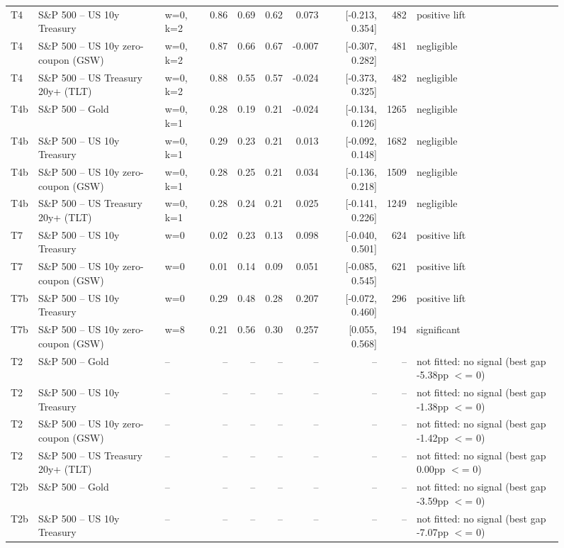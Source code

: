 \begin{figure}
\begin{tabular}{lllrrrrrrl}
T4 & S\&P 500 -- US 10y Treasury & w=0, k=2 & 0.86 & 0.69 & 0.62 & 0.073 & [-0.213, 0.354] & 482 & positive lift \\
T4 & S\&P 500 -- US 10y zero-coupon (GSW) & w=0, k=2 & 0.87 & 0.66 & 0.67 & -0.007 & [-0.307, 0.282] & 481 & negligible \\
T4 & S\&P 500 -- US Treasury 20y+ (TLT) & w=0, k=2 & 0.88 & 0.55 & 0.57 & -0.024 & [-0.373, 0.325] & 482 & negligible \\
T4b & S\&P 500 -- Gold & w=0, k=1 & 0.28 & 0.19 & 0.21 & -0.024 & [-0.134, 0.126] & 1265 & negligible \\
T4b & S\&P 500 -- US 10y Treasury & w=0, k=1 & 0.29 & 0.23 & 0.21 & 0.013 & [-0.092, 0.148] & 1682 & negligible \\
T4b & S\&P 500 -- US 10y zero-coupon (GSW) & w=0, k=1 & 0.28 & 0.25 & 0.21 & 0.034 & [-0.136, 0.218] & 1509 & negligible \\
T4b & S\&P 500 -- US Treasury 20y+ (TLT) & w=0, k=1 & 0.28 & 0.24 & 0.21 & 0.025 & [-0.141, 0.226] & 1249 & negligible \\
T7 & S\&P 500 -- US 10y Treasury & w=0 & 0.02 & 0.23 & 0.13 & 0.098 & [-0.040, 0.501] & 624 & positive lift \\
T7 & S\&P 500 -- US 10y zero-coupon (GSW) & w=0 & 0.01 & 0.14 & 0.09 & 0.051 & [-0.085, 0.545] & 621 & positive lift \\
T7b & S\&P 500 -- US 10y Treasury & w=0 & 0.29 & 0.48 & 0.28 & 0.207 & [-0.072, 0.460] & 296 & positive lift \\
T7b & S\&P 500 -- US 10y zero-coupon (GSW) & w=8 & 0.21 & 0.56 & 0.30 & 0.257 & [0.055, 0.568] & 194 & significant \\
T2 & S\&P 500 -- Gold & -- & -- & -- & -- & -- & -- & -- & not fitted: no signal (best gap -5.38pp $<$= 0) \\
T2 & S\&P 500 -- US 10y Treasury & -- & -- & -- & -- & -- & -- & -- & not fitted: no signal (best gap -1.38pp $<$= 0) \\
T2 & S\&P 500 -- US 10y zero-coupon (GSW) & -- & -- & -- & -- & -- & -- & -- & not fitted: no signal (best gap -1.42pp $<$= 0) \\
T2 & S\&P 500 -- US Treasury 20y+ (TLT) & -- & -- & -- & -- & -- & -- & -- & not fitted: no signal (best gap 0.00pp $<$= 0) \\
T2b & S\&P 500 -- Gold & -- & -- & -- & -- & -- & -- & -- & not fitted: no signal (best gap -3.59pp $<$= 0) \\
T2b & S\&P 500 -- US 10y Treasury & -- & -- & -- & -- & -- & -- & -- & not fitted: no signal (best gap -7.07pp $<$= 0) \\

\end{tabular}
\end{figure}
